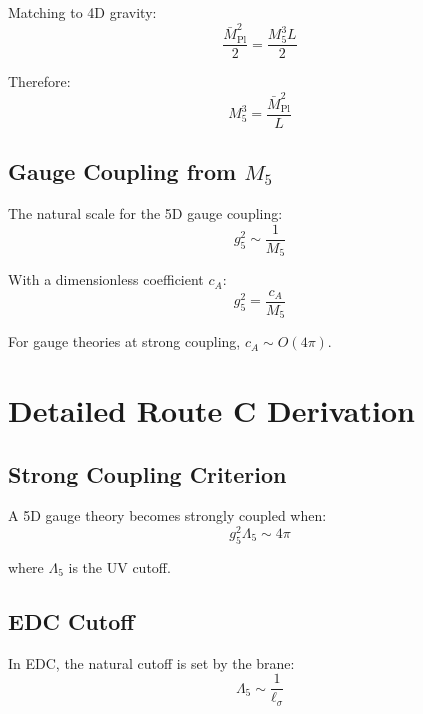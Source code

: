 \documentclass[11pt,a4paper]{article}
\begin{document}
Matching to 4D gravity:
\begin{equation}
\label{eq:mpl-m5}
\frac{\bar{M}_{\text{Pl}}^2}{2} = \frac{M_5^3 L}{2}
\end{equation}

Therefore:
\begin{equation}
\label{eq:m5-formula}
M_5^3 = \frac{\bar{M}_{\text{Pl}}^2}{L}
\end{equation}

\subsection{Gauge Coupling from $M_5$}
\label{app:g5-m5}

The natural scale for the 5D gauge coupling:
\begin{equation}
\label{eq:g5-natural}
g_5^2 \sim \frac{1}{M_5}
\end{equation}

With a dimensionless coefficient $c_A$:
\begin{equation}
\label{eq:g5-ca}
g_5^2 = \frac{c_A}{M_5}
\end{equation}

For gauge theories at strong coupling, $c_A \sim O(4\pi)$.

\section{Detailed Route C Derivation}
\label{app:route-c}

\subsection{Strong Coupling Criterion}
\label{app:strong-coupling}

A 5D gauge theory becomes strongly coupled when:
\begin{equation}
\label{eq:strong-criterion}
g_5^2 \Lambda_5 \sim 4\pi
\end{equation}

where $\Lambda_5$ is the UV cutoff.

\subsection{EDC Cutoff}
\label{app:edc-cutoff}

In EDC, the natural cutoff is set by the brane:
\begin{equation}
\label{eq:edc-cutoff}
\Lambda_5 \sim \frac{1}{\ell_\sigma}
\end{equation}
\end{document}

